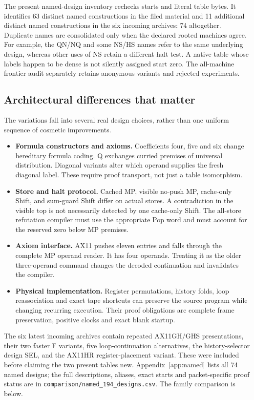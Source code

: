 \documentclass[11pt,letterpaper]{article}
\newcommand{\file}[1]{\nolinkurl{#1}}
\begin{document}
The present named-design inventory rechecks starts and literal table bytes.
It identifies 63 distinct named constructions in the filed material and
11 additional distinct named constructions in the six incoming archives:
74 altogether. Duplicate names are consolidated only when the declared
rooted machines agree. For example, the QN/NQ and some NS/HS names refer
to the same underlying design, whereas other uses of NS retain a different
halt test. A native table whose labels happen to be dense is not silently
assigned start zero. The all-machine frontier audit separately retains
anonymous variants and rejected experiments.



\subsection{Architectural differences that matter}
The variations fall into several real design choices, rather than one
uniform sequence of cosmetic improvements.
\begin{itemize}
\item \textbf{Formula constructors and axioms.} Coefficients four, five
and six change hereditary formula coding. Q exchanges curried premises
of universal distribution. Diagonal variants alter which operand supplies
the fresh diagonal label. These require proof transport, not just a table
isomorphism.
\item \textbf{Store and halt protocol.} Cached MP, visible no-push MP,
cache-only Shift, and sum-guard Shift differ on actual stores. A contradiction
in the visible top is not necessarily detected by one cache-only Shift.
The all-store refutation compiler must use the appropriate Pop word and
must account for the reserved zero below MP premises.
\item \textbf{Axiom interface.} AX11 pushes eleven entries and falls
through the complete MP operand reader. It has four operands. Treating it
as the older three-operand command changes the decoded continuation and
invalidates the compiler.
\item \textbf{Physical implementation.} Register permutations, history
folds, loop reassociation and exact tape shortcuts can preserve the source
program while changing recurring execution. Their proof obligations are
complete frame preservation, positive clocks and exact blank startup.
\end{itemize}

The six latest incoming archives contain repeated AX11GH/GHS presentations,
their two faster F variants, five loop-continuation alternatives, the
history-selector design SEL, and the AX11HR register-placement variant.
These were included before claiming the two present tables new.
Appendix~\ref{app:named} lists all 74 named designs; the full descriptions,
aliases, exact starts and packet-specific proof status are in
\file{comparison/named_194_designs.csv}. The family comparison is below.
\end{document}
